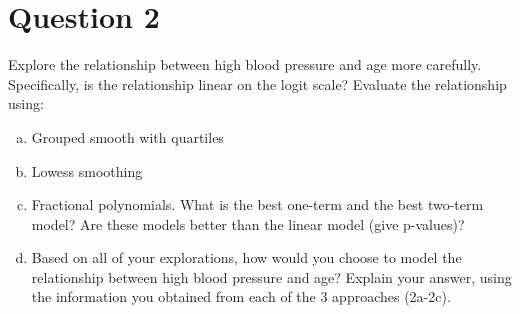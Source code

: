 \documentclass{article}
\begin{document}
\section{Question 2} 
  Explore the relationship between high blood pressure and age more carefully.  Specifically, is the relationship linear on the logit scale?  Evaluate the relationship using:
\begin{enumerate}[a.]
    \item  Grouped smooth with quartiles 
    \item Lowess smoothing
    \item Fractional polynomials.   What is the best one-term and the best two-term model?   Are these models better than the linear model (give p-values)? 
    \item Based on all of your explorations, how would you choose to model the relationship between high blood pressure and age?  Explain your answer, using the information you obtained from each of the 3 approaches (2a-2c).  
\end{enumerate}
\end{document}
